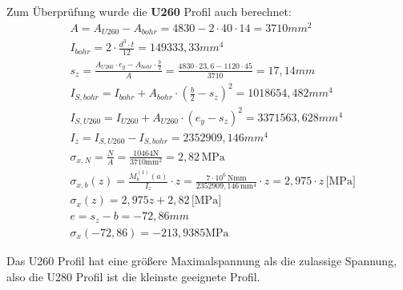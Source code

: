 Zum Überprüfung wurde die \textbf{U260} Profil auch berechnet:
\begin{align*}
  &A = A_{U260} - A_{bohr} = 4830 - 2 \cdot 40 \cdot 14 = 3710 mm^2 \\
  &I_{bohr} = 2 \cdot \frac{d^3 \cdot t}{12} = 149333,33 mm^4 \\
  &s_z = \frac{A_{U260} \cdot e_y - A_{bohr} \cdot \frac{b}{2}}{A} = \frac{4830 \cdot 23,6 - 1120 \cdot 45}{3710} = 17,14mm \\
  &I_{S,bohr} = I_{bohr} + A_{bohr} \cdot (\frac{b}{2} - s_z)^2 = 1018654,482 mm^4 \\
  &I_{S,U260} = I_{U260} + A_{U260} \cdot (e_y - s_z)^2 = 3371563,628 mm^4 \\
  &I_z = I_{S,U260} - I_{S,bohr} = 2352909,146 mm^4 \\
  &\sigma_{x,N} = \frac{N}{A} = \frac{10464 \text{N}}{3710 \text{mm}^2} = 2,82 \, \text{MPa} \\
  &\sigma_{x,b}(z) = \frac{M_{b}^{(1)}(a)}{I_{z}} \cdot z = \frac{7 \cdot 10^6 \, \text{Nmm}}{2352909,146 \, \text{mm}^4} \cdot z = 2,975 \cdot z \, \text{[MPa]} \\
  &\sigma_x(z) = 2,975z + 2,82 \, \text{[MPa]} \\
  &e = s_z - b = -72,86 mm \\
  &\sigma_x(-72,86) = -213,9385 \text{MPa}
\end{align*}

Das U260 Profil hat eine größere Maximalspannung als die zulassige Spannung, also die U280 Profil ist die kleinste geeignete Profil.
